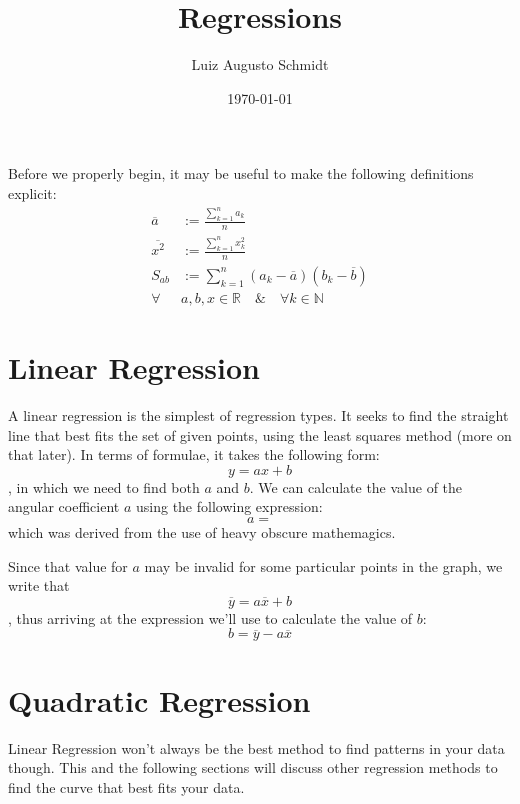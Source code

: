 \documentclass{article}
\title{Regressions}
\author{Luiz Augusto Schmidt}
\date{\today}
\begin{document}
	\maketitle
	Before we properly begin, it may be useful to make the following definitions explicit:
		\begin{equation*}
			\begin{split}
				\overline{a} &:= \frac{\sum_{k=1}^{n} a_{k}}{n} \\
				\overline{x^{2}} &:= \frac{\sum_{k = 1}^{n} x_{k}^{2}}{n} \\
				S_{ab} &:= \sum_{k = 1}^{n}(a_{k} - \overline{a})(b_{k} - \overline{b}) \\
				\forall &a, b, x \in \mathbb{R}  \quad \& \quad \forall k \in \mathbb{N} 
			\end{split}
		\end{equation*}
	\section{Linear Regression}
		A linear regression is the simplest of regression types. It seeks to find the  straight line that best fits the set of given points, using the least squares method (more on that later). In terms of formulae, it takes the following form: \[y = ax + b\], in which we need to find both $a$ and $b$.  We can calculate the value of the angular coefficient $a$ using the following expression: 
		\begin{equation}
			a = 
		\end{equation}
		which was derived from the use of heavy obscure mathemagics.
		
		Since that value for $a$ may be invalid for some particular points in the graph, we write that \[\overline{y} = a\overline{x} + b\], thus arriving at the expression we'll use to calculate the value of \(b\):
		\begin{equation}
			b = \overline{y} - a\overline{x}
		\end{equation} 
		
		
	\section{Quadratic Regression}
		Linear Regression won't always be the best method to find patterns in your data though. This and the following sections will discuss other regression methods to find the curve that best fits your data.
		
\end{document}
